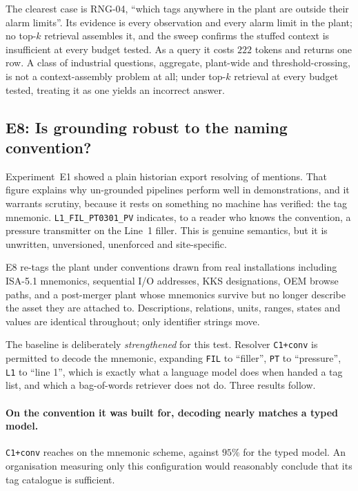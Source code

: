 The clearest case is RNG-04, ``which tags anywhere in the plant are outside their
alarm limits''. Its evidence is every observation and every alarm limit in the
plant; no top-$k$ retrieval assembles it, and the sweep confirms the stuffed
context is insufficient at every budget tested. As a query it costs $222$ tokens
and returns one row. A class of industrial questions, aggregate, plant-wide and
threshold-crossing, is not a context-assembly problem at all; under top-$k$
retrieval at every budget tested, treating it as one yields an incorrect answer.

\subsection{E8: Is grounding robust to the naming convention?}
\label{sec:e8}



Experiment~E1 showed a plain historian export resolving \GrndTopOneCOne{} of
mentions. That figure explains why un-grounded pipelines perform well in
demonstrations, and it warrants scrutiny, because it rests on something no machine
has verified: the tag mnemonic. \texttt{L1\_FIL\_PT0301\_PV} indicates, to a
reader who knows the convention, a pressure transmitter on the Line~1 filler. This
is genuine semantics, but it is unwritten, unversioned, unenforced and
site-specific.

E8 re-tags the plant under \NSchemes{} conventions drawn from real installations
including ISA-5.1 mnemonics, sequential I/O addresses, KKS designations, OEM browse
paths, and a post-merger plant whose mnemonics survive but no longer describe
the asset they are attached to. Descriptions, relations, units, ranges, states
and values are identical throughout; only identifier strings move.

The baseline is deliberately \emph{strengthened} for this test. Resolver
\texttt{C1+conv} is permitted to decode the mnemonic, expanding \texttt{FIL}
to ``filler'', \texttt{PT} to ``pressure'', \texttt{L1} to ``line 1'', which
is exactly what a language model does when handed a tag list, and which a
bag-of-words retriever does not do. Three results follow.

\paragraph{On the convention it was built for, decoding nearly matches a typed
model.} \texttt{C1+conv} reaches \ConvMnemonicDecoded{} on the mnemonic scheme,
against $95\%$ for the typed model. An organisation measuring only this
configuration would reasonably conclude that its tag catalogue is sufficient.

